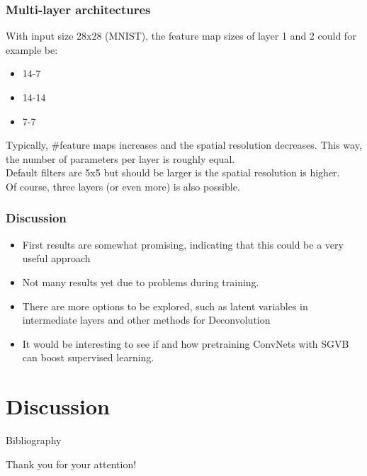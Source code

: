 \documentclass{beamer}
\begin{document}
\begin{frame}
\frametitle{Multi-layer architectures}
With input size 28x28 (MNIST), the feature map sizes of layer 1 and 2 could for example be:
\begin{itemize}
\item 14-7 
\item 14-14
\item 7-7
\end{itemize}
Typically, \#feature maps increases and the spatial resolution decreases. This way, the number of parameters per layer is roughly equal. \\
Default filters are 5x5 but should be larger is the spatial resolution is higher. \\
Of course, three layers (or even more) is also possible.
\end{frame}

\begin{frame}
\frametitle{Discussion}
	\begin{itemize}
		\item First results are somewhat promising, indicating that this could be a very useful approach
		\item Not many results yet due to problems during training.
		\item There are more options to be explored, such as latent variables in intermediate layers and other methods for Deconvolution
		\item It would be interesting to see if and how pretraining ConvNets with SGVB can boost supervised learning.
	\end{itemize}
\end{frame}

\section{Discussion}


\begin{frame}{Bibliography}
	\nocite{*}
	
	
\end{frame}


\begin{frame}
\Huge{\centerline{Thank you for your attention!}}
\end{frame}

\end{document}
